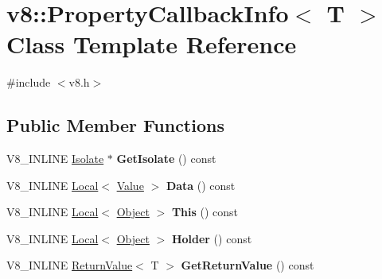 \hypertarget{classv8_1_1PropertyCallbackInfo}{}\section{v8\+:\+:Property\+Callback\+Info$<$ T $>$ Class Template Reference}
\label{classv8_1_1PropertyCallbackInfo}


{\ttfamily \#include $<$v8.\+h$>$}

\subsection*{Public Member Functions}
\begin{DoxyCompactItemize}
\item 
\hypertarget{classv8_1_1PropertyCallbackInfo_a066d0c9eee98f80fb78d97961eafa8ad}{}V8\+\_\+\+I\+N\+L\+I\+N\+E \hyperlink{classv8_1_1Isolate}{Isolate} $\ast$ {\bfseries Get\+Isolate} () const \label{classv8_1_1PropertyCallbackInfo_a066d0c9eee98f80fb78d97961eafa8ad}

\item 
\hypertarget{classv8_1_1PropertyCallbackInfo_a64edbaeb902e360fc2a4d353c8c4930f}{}V8\+\_\+\+I\+N\+L\+I\+N\+E \hyperlink{classv8_1_1Local}{Local}$<$ \hyperlink{classv8_1_1Value}{Value} $>$ {\bfseries Data} () const \label{classv8_1_1PropertyCallbackInfo_a64edbaeb902e360fc2a4d353c8c4930f}

\item 
\hypertarget{classv8_1_1PropertyCallbackInfo_a747202a7d4db0b930f19f9466c3a5acb}{}V8\+\_\+\+I\+N\+L\+I\+N\+E \hyperlink{classv8_1_1Local}{Local}$<$ \hyperlink{classv8_1_1Object}{Object} $>$ {\bfseries This} () const \label{classv8_1_1PropertyCallbackInfo_a747202a7d4db0b930f19f9466c3a5acb}

\item 
\hypertarget{classv8_1_1PropertyCallbackInfo_a8eb97205ce7bd25b446b03643d02570d}{}V8\+\_\+\+I\+N\+L\+I\+N\+E \hyperlink{classv8_1_1Local}{Local}$<$ \hyperlink{classv8_1_1Object}{Object} $>$ {\bfseries Holder} () const \label{classv8_1_1PropertyCallbackInfo_a8eb97205ce7bd25b446b03643d02570d}

\item 
\hypertarget{classv8_1_1PropertyCallbackInfo_a4e9bc4da66ed3ea21aac7dbb9c11465b}{}V8\+\_\+\+I\+N\+L\+I\+N\+E \hyperlink{classv8_1_1ReturnValue}{Return\+Value}$<$ T $>$ {\bfseries Get\+Return\+Value} () const \label{classv8_1_1PropertyCallbackInfo_a4e9bc4da66ed3ea21aac7dbb9c11465b}

\end{DoxyCompactItemize}
